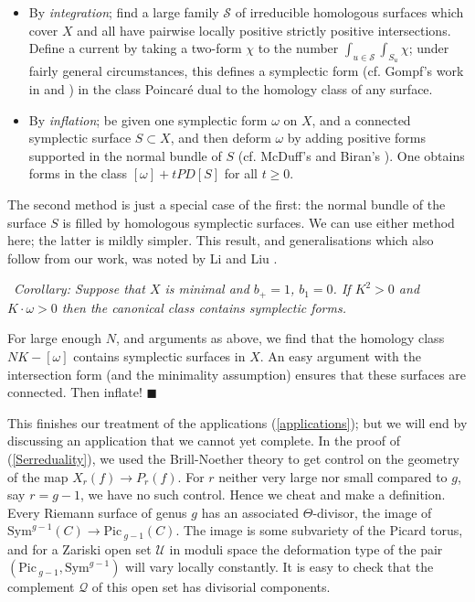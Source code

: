 \documentclass[10pt]{article}
\newcommand{\Sym}{\mathrm{Sym}}
\newcommand{\Pic}{\mathrm{Pic \,}}
\newcounter{Universal}[section]
\renewcommand{\theUniversal}{\thesection.\arabic{Universal}}
\newenvironment{Italic}{\refstepcounter{Universal} \par \vspace{0.5cm}
\noindent {\bf (\theUniversal)}\ \it}{\par \vspace{0.5cm}}
\newenvironment{Cor}{\begin{Italic}{\sc Corollary: }}{\end{Italic}}
\newenvironment{Pf}{\par \noindent{\sc Proof:} }{\quad $\blacksquare$ \par
\vspace{0.5cm}}
\begin{document}
\begin{itemize}
\item By \emph{integration}; find a large family $\mathcal{S}$ of
  irreducible homologous surfaces which
  cover $X$ and all have pairwise locally positive strictly positive
  intersections.  Define a current by taking a two-form $\chi$ to the
  number $\int_{u \in \mathcal{S}} \int_{S_u} \chi$; under fairly
  general circumstances, this defines a symplectic form (cf. Gompf's
  work in \cite{Gompf} and \cite{GompfGokova}) in the class Poincar\'e
  dual to the homology class of any surface.

\item By \emph{inflation};  be given one symplectic form $\omega$ on
  $X$, and a connected symplectic surface $S \subset X$, and then
  deform $\omega$ by adding positive forms supported in the normal
  bundle of $S$ (cf. McDuff's \cite{McDuff:DeftoIso} and Biran's
  \cite{Biran}).  One obtains forms in the class $[\omega] + tPD[S]$
  for all $t \geq 0$.
\end{itemize}

\noindent The second method is just a special case of the first: the
normal bundle of the surface $S$ is filled by homologous symplectic
surfaces.  We can use either method here; the latter is mildly
simpler.  This result, and generalisations which also follow from our
work, was noted by Li and Liu \cite{Li-Liu}.

\begin{Cor}
Suppose that $X$ is minimal and $b_+ = 1$, $b_1 = 0$.  If
$K^2 > 0$ and $K \cdot \omega > 0$ then the canonical class contains
symplectic forms.
\end{Cor}

\begin{Pf} For large enough $N$, and
arguments as above, we find that the homology class $NK-[\omega]$
contains symplectic surfaces in $X$.  An easy argument with the
intersection form (and the minimality assumption) ensures that
these surfaces are connected.  Then inflate!  
\end{Pf}

\noindent  This finishes our
treatment of the applications (\ref{applications}); but we will end by
discussing an application that we cannot yet complete.
In the proof of (\ref{Serreduality}), we used the
Brill-Noether theory to get control on the 
geometry of the map $X_r(f) \rightarrow P_r(f)$.  For $r$ neither very
large nor small
compared to $g$, say $r=g-1$, we have no such control.  Hence we cheat
and make a definition.  Every Riemann surface of genus $g$ has an
associated $\Theta$-divisor, the image of $\Sym^{g-1}(C) \rightarrow
\Pic_{g-1}(C)$.  The image is some subvariety of the Picard torus, and
for a Zariski open set $\mathcal{U}$ in moduli space the deformation
type of the 
pair $(\Pic_{g-1}, \Sym^{g-1})$ will vary locally constantly.  It is
easy to check that the complement $\mathcal{Q}$ of this open set has
divisorial components. 
\end{document}
